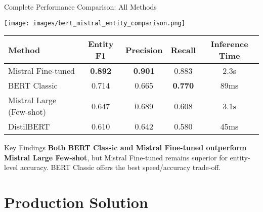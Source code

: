\documentclass[aspectratio=169]{beamer}
\begin{document}
\begin{frame}{Complete Performance Comparison: All Methods}
\begin{center}
\texttt{[image: images/bert\_mistral\_entity\_comparison.png]}
\end{center}

\vspace{0.3cm}
\begin{table}[h]
\centering
\scriptsize
\begin{tabular}{lcccc}
\toprule
\textbf{Method} & \textbf{Entity F1} & \textbf{Precision} & \textbf{Recall} & \textbf{Inference Time} \\
\midrule
Mistral Fine-tuned & \textbf{0.892} & \textbf{0.901} & 0.883 & 2.3s \\
BERT Classic & 0.714 & 0.665 & \textbf{0.770} & 89ms \\
Mistral Large (Few-shot) & 0.647 & 0.689 & 0.608 & 3.1s \\
DistilBERT & 0.610 & 0.642 & 0.580 & 45ms \\
\bottomrule
\end{tabular}
\end{table}

\begin{alertblock}{Key Findings}
\textbf{Both BERT Classic and Mistral Fine-tuned outperform Mistral Large Few-shot}, but Mistral Fine-tuned remains superior for entity-level accuracy. BERT Classic offers the best speed/accuracy trade-off.
\end{alertblock}
\end{frame}

\section{Production Solution}
\end{document}
